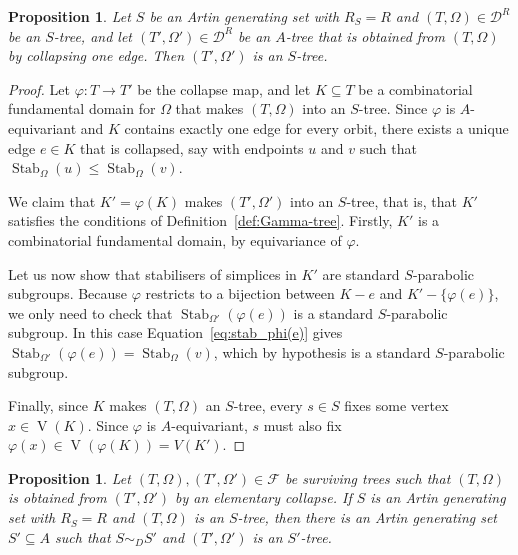 \documentclass[svgnames]{amsart}
\theoremstyle{plain}
\newtheorem{prop}[thm]{Proposition}
\theoremstyle{definition}
\newcommand{\crush}[2]{\mathcal{#1}^{#2}}
\newcommand{\Stab}[2]{\operatorname{Stab}_{#1}\left(#2\right)}
\renewcommand{\phi}{\varphi}
\newcommand{\ver}[1]{\operatorname{V}(#1)}
\begin{document}
\begin{prop}
    \label{prop:collapse Gamma-tree}
    Let $S$ be an Artin generating set with $R_S = R$ and $(T,\Omega) \in \crush{D}{R}$ be an $S$-tree, and let $(T',\Omega')\in\crush{D}{R}$ be an $A$-tree that is obtained from $(T,\Omega)$ by collapsing one edge. Then  $(T',\Omega')$ is an $S$-tree.
\end{prop}



\begin{proof}
    Let $\phi\colon T \to T'$ be the collapse map, and let $K\subseteq T$ be a combinatorial fundamental domain for $\Omega$ that makes $(T,\Omega)$ into an $S$-tree. Since $\phi$ is $A$-equivariant and $K$ contains exactly one edge for every orbit, there exists a unique edge $e\in K$ that is collapsed, say with endpoints $u$ and $v$ such that $\Stab{\Omega}{u}\le\Stab{\Omega}{v}$. 
    
    We claim that $K'=\phi(K)$ makes $(T',\Omega')$ into an $S$-tree, that is, that $K'$ satisfies the conditions of Definition~\ref{def:Gamma-tree}. Firstly, $K'$ is a combinatorial fundamental domain, by equivariance of $\phi$. 
    
    Let us now show that stabilisers of simplices in $K'$ are standard $S$-parabolic subgroups. Because $\phi$ restricts to a bijection between $K- e$ and $ K'-\{\phi(e)\}$, we only need to check that $\Stab{\Omega'}{\phi(e)}$ is a standard $S$-parabolic subgroup. In this case Equation~\eqref{eq:stab_phi(e)} gives $\Stab{\Omega'}{\phi(e)}=\Stab{\Omega}{v}$, which by hypothesis is a standard $S$-parabolic subgroup. 

    Finally, since $K$ makes $(T, \Omega)$ an $S$-tree, every $s\in S$ fixes some vertex $x\in\ver K$. Since $\phi$ is $A$-equivariant,  $s$ must also fix $\phi(x) \in \ver{\phi(K)} = V(K')$.
\end{proof}

\begin{prop}
    \label{prop:expansion Gamma-tree}
    Let $(T,\Omega),(T',\Omega')\in\mathcal F$ be surviving trees such that $(T,\Omega)$ is obtained from $(T',\Omega')$ by an elementary collapse. If $S$ is an Artin generating set with $R_S = R$ and  $(T,\Omega)$ is an $S$-tree, then there is an Artin generating set $S'\subseteq A$ such that $S\sim_D S'$ and $(T',\Omega')$ is an $S'$-tree.
\end{prop}
\end{document}
